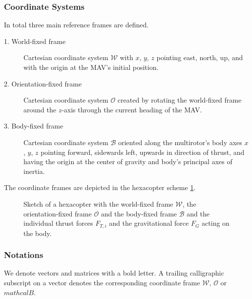 \subsubsection{Coordinate Systems}
In total three main reference frames are defined. 
\begin{description}
\item[1. World-fixed frame] Cartesian coordinate system $\mathcal{W}$ with $x$, $y$, $z$ pointing east, north, up, and with the origin at the MAV's initial position.
\item[2. Orientation-fixed frame] Cartesian coordinate system $\mathcal{O}$ created by rotating the world-fixed frame around the $z$-axis through the current heading of the MAV. 
\item[3. Body-fixed frame] Cartesian coordinate system $\mathcal{B}$ oriented along the multirotor's body axes $x$, $y$, $z$ pointing forward, sidewards left, upwards in direction of thrust, and having the origin at the center of gravity and body's principal axes of inertia.
\end{description}

The coordinate frames are depicted in the hexacopter scheme \ref{fig:hexa}.


\begin{figure}
   \centering
   \def\svgwidth{0.75\textwidth}
   
   \caption{Sketch of a hexacopter with the world-fixed frame $\mathcal{W}$, the orientation-fixed frame $\mathcal{O}$ and the body-fixed frame $\mathcal{B}$ and the individual thrust forces $F_{T,i}$ and the gravitational force $F_G$ acting on the body.}
   \label{fig:hexa}
\end{figure}


\subsubsection{Notations}
We denote vectors and matrices with a bold letter. A trailing calligraphic subscript on a vector denotes the corresponding coordinate frame $\mathcal{W}$, $\mathcal{O}$ or $mathcal{B}$. 

